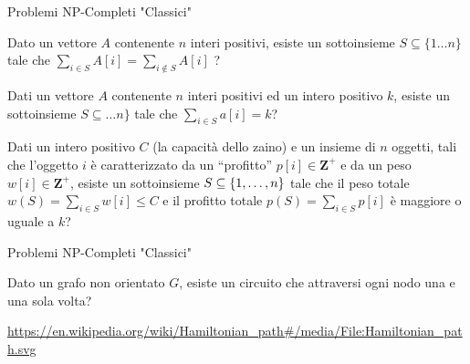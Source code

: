 \begin{frame}{Problemi NP-Completi "Classici"}

\small
\vspace{-9pt}
\begin{myboxtitle}
Dato un vettore $A$ contenente $n$ interi positivi, esiste un
sottoinsieme $S \subseteq \{1 \ldots n\}$ tale che $\sum_{i\in S} A[i] = \sum_{i \notin S} A[i]$ ?
\end{myboxtitle}

\begin{myboxtitle}
Dati un vettore $A$ contenente $n$ interi positivi ed un intero positivo $k$, \alert{esiste} un sottoinsieme $S \subseteq \ldots n\}$ tale che 
$\sum_{i \in S} a[i] = k$?
\end{myboxtitle}

\begin{myboxtitle}
Dati un intero positivo $C$ (la capacità dello zaino) e un insieme di $n$ oggetti, tali che l'oggetto $i$ è caratterizzato da un ``profitto'' $p[i] \in \mathbf{Z}^+$ e da un peso $w[i] \in \mathbf{Z}^+$, esiste un sottoinsieme $S \subseteq \{ 1, \ldots, n \}$ tale che il peso totale $w(S) = \sum_{i \in S} w[i] \le C$ e il profitto totale $p(S) = \sum_{i \in S} p[i]$ è maggiore o uguale a $k$?
\end{myboxtitle}

\end{frame}

\begin{frame}{Problemi NP-Completi "Classici"}

\vspace{-9pt}
\begin{myboxtitle}
Dato un grafo non orientato $G$, esiste un circuito che attraversi ogni nodo
una e una sola volta?
\end{myboxtitle}

\begin{center}
\end{center}

\vfill
\tiny
\url{https://en.wikipedia.org/wiki/Hamiltonian\_path\#/media/File:Hamiltonian\_path.svg}

\end{frame}

